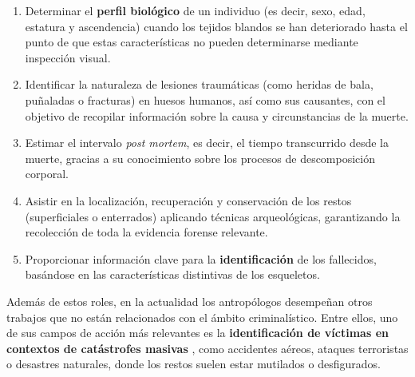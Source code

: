 \begin{enumerate}

    \item Determinar el \textbf{perfil biológico} de un individuo (es decir, sexo, edad, estatura y ascendencia) 
    cuando los tejidos blandos se han deteriorado hasta el punto de que estas características no pueden determinarse
    mediante inspección visual. 

    \item Identificar la naturaleza de lesiones traumáticas (como heridas de bala, puñaladas o fracturas) en huesos humanos, 
    así como sus causantes, con el objetivo de recopilar información sobre la causa y circunstancias de la muerte.

    \item Estimar el intervalo \textit{post mortem}, es decir, el tiempo transcurrido desde la muerte, gracias a su 
    conocimiento sobre los procesos de descomposición corporal.
    
    \item Asistir en la localización, recuperación y conservación de los restos (superficiales o enterrados) aplicando 
    técnicas arqueológicas, garantizando la recolección de toda la evidencia forense relevante.

    \item Proporcionar información clave para la \textbf{identificación} de los fallecidos, basándose en las características
    distintivas de los esqueletos.

\end{enumerate}

Además de estos roles, en la actualidad los antropólogos desempeñan otros trabajos que no están relacionados con el ámbito 
criminalístico. Entre ellos, uno de sus campos de acción más relevantes es la \textbf{identificación de víctimas en contextos 
de catástrofes masivas} \cite{deBoer2019, prinz2007}, como accidentes aéreos, ataques terroristas o desastres naturales,
donde los restos suelen estar mutilados o desfigurados.


